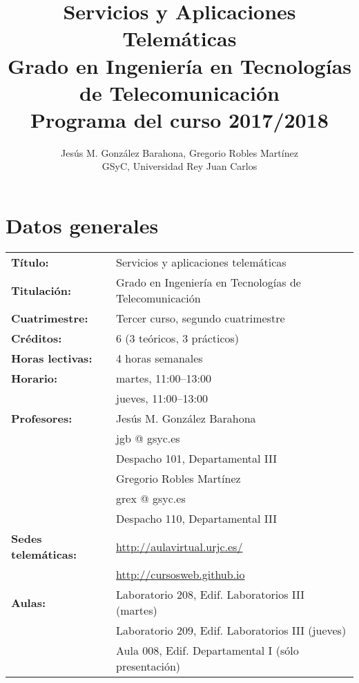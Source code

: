 \documentclass[a4paper,12pt]{article}
\title{Servicios y Aplicaciones Telemáticas \\
Grado en Ingeniería en Tecnologías de Telecomunicación \\
Programa del curso 2017/2018}
\author{Jesús M. González Barahona, Gregorio Robles Martínez \\
GSyC, Universidad Rey Juan Carlos}
\date{}
\begin{document}
\maketitle

\tableofcontents

\newpage

\section{Datos generales}

\begin{tabular}{ll}
\textbf{Título:} & Servicios y aplicaciones telemáticas \\
\textbf{Titulación:} & Grado en Ingeniería en Tecnologías de Telecomunicación \\
\textbf{Cuatrimestre:} & Tercer curso, segundo cuatrimestre \\
\textbf{Créditos:} & 6 (3 teóricos, 3 prácticos) \\
\textbf{Horas lectivas:} & 4 horas semanales \\
\textbf{Horario:} & martes, 11:00--13:00 \\
                  & jueves, 11:00--13:00 \\
\textbf{Profesores:}
& Jesús M. González Barahona \\
& \hspace{1cm}jgb @ gsyc.es \\
& \hspace{1cm}Despacho 101, Departamental III\\
& Gregorio Robles Martínez\\
& \hspace{1cm}grex @ gsyc.es \\
& \hspace{1cm}Despacho 110, Departamental III\\
\textbf{Sedes telemáticas:} & \url{http://aulavirtual.urjc.es/} \\
                            & \url{http://cursosweb.github.io} \\
\textbf{Aulas:} & Laboratorio 208, Edif. Laboratorios III (martes) \\
                & Laboratorio 209, Edif. Laboratorios III (jueves) \\
                & Aula 008, Edif. Departamental I (sólo presentación)\\
\end{tabular}
\end{document}
